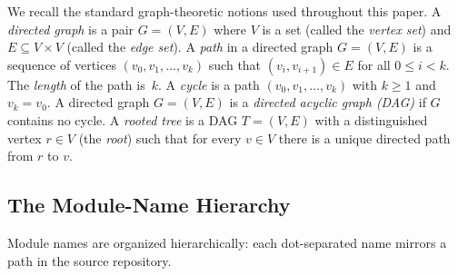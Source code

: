 We recall the standard graph-theoretic notions used throughout this paper. A \emph{directed graph} is a pair $G = (V, E)$ where $V$ is a set (called the \emph{vertex set}) and $E \subseteq V \times V$ (called the \emph{edge set}). A \emph{path} in a directed graph $G = (V, E)$ is a sequence of vertices $(v_0, v_1, \ldots, v_k)$ such that $(v_i, v_{i+1}) \in E$ for all $0 \le i < k$. The \emph{length} of the path is~$k$.
A \emph{cycle} is a path $(v_0, v_1, \ldots, v_k)$ with $k \ge 1$ and $v_k = v_0$. A directed graph $G = (V, E)$ is a \emph{directed acyclic graph (DAG)} if $G$ contains no cycle. A \emph{rooted tree} is a DAG $T = (V, E)$ with a distinguished vertex $r \in V$ (the \emph{root}) such that for every $v \in V$ there is a unique directed path from $r$ to $v$.

\subsection{The Module-Name Hierarchy}
\label{sec:namespace-tree}

Module names are organized hierarchically: each dot-separated name mirrors a path in the source repository.

